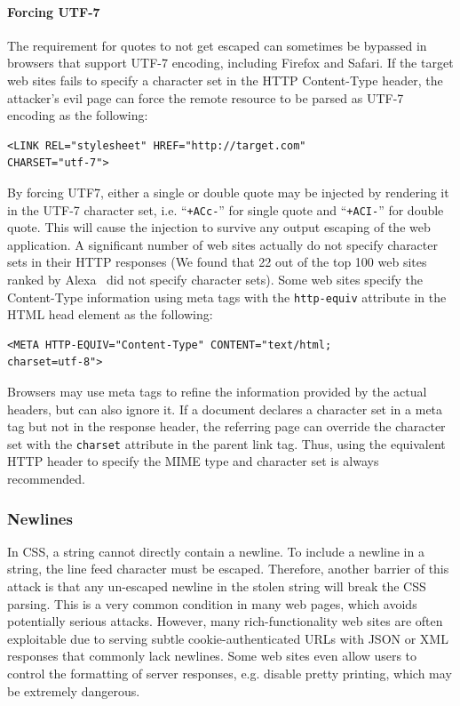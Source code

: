 \documentclass{acm_proc_article-sp}
\begin{document}
\paragraph{Forcing UTF-7}
The requirement for quotes to not get escaped can sometimes be bypassed in browsers that support UTF-7 encoding, including Firefox and Safari. If the target web sites fails to specify a character set in the HTTP Content-Type header, the attacker's evil page can force the remote resource to be parsed as UTF-7 encoding as the following:
\begin{verbatim}
<LINK REL="stylesheet" HREF="http://target.com"
CHARSET="utf-7">
\end{verbatim}
By forcing UTF7, either a single or double quote may be injected by rendering it in the UTF-7 character set, i.e. ``\texttt{+ACc-}'' for single quote and ``\texttt{+ACI-}'' for double quote. This will cause the injection to survive any output escaping of the web application. A significant number of web sites actually do not specify character sets in their HTTP responses (We found that 22 out of the top 100 web sites ranked by Alexa~\cite{alexa} did not specify character sets). Some web sites specify the Content-Type information using meta tags with the \texttt{http-equiv} attribute in the HTML head element as the following:
\begin{verbatim}
<META HTTP-EQUIV="Content-Type" CONTENT="text/html;
charset=utf-8">
\end{verbatim}
Browsers may use meta tags to refine the information provided by the actual headers, but can also ignore it. If a document declares a character set in a meta tag but not in the response header, the referring page can override the character set with the \texttt{charset} attribute in the parent link tag. Thus, using the equivalent HTTP header to specify the MIME type and character set is always recommended.

\subsubsection{Newlines}
In CSS, a string cannot directly contain a newline. To include a newline in a string, the line feed character must be escaped. Therefore, another barrier of this attack is that any un-escaped newline in the stolen string will break the CSS parsing. This is a very common condition in many web pages, which avoids potentially serious attacks. However, many rich-functionality web sites are often exploitable due to serving subtle cookie-authenticated URLs with JSON or XML responses that commonly lack newlines. Some web sites even allow users to control the formatting of server responses, e.g. disable pretty printing, which may be extremely dangerous.
\end{document}
